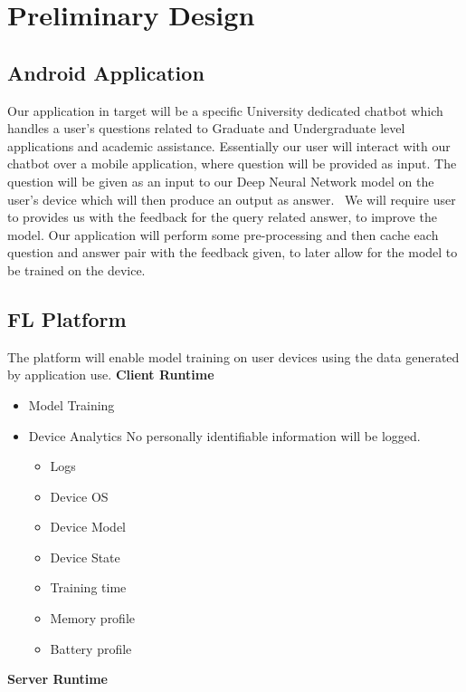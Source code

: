 \section{Preliminary Design}

    \subsection{Android Application}

        Our application in target will be a specific University dedicated chatbot which handles a user's questions related to Graduate and Undergraduate level applications and academic assistance. Essentially our user will interact with our chatbot over a mobile application, where question will be provided as input. The question will be given as an input to our Deep Neural Network model on the user's device which will then produce an output as answer.~\cite{9225395} We will require user to provides us with the feedback for the query related answer, to improve the model. Our application will perform some pre-processing and then cache each question and answer pair with the feedback given, to later allow for the model to be trained on the device.
    
        \subsection{FL Platform}
        The platform will enable model training on user devices using the data generated by application use.
        \textbf{Client Runtime}
            \begin{itemize}
                \item Model Training
                \item Device Analytics \newline
                    No personally identifiable information will be logged.  
                    \begin{itemize}
                        \item Logs
                        \item Device OS
                        \item Device Model
                        \item Device State
                        \item Training time
                        \item Memory profile
                        \item Battery profile
                    \end{itemize}
            \end{itemize}
        \textbf{Server Runtime}
